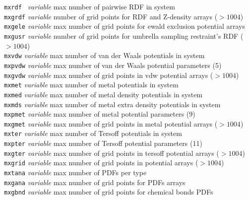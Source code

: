 \begin{tabbing}
\> {\tt mxrdf }      \> {\em variable}       \> max number of pairwise RDF in system \\
\> {\tt mxgrdf}      \> {\em variable}       \> number of grid points for RDF and Z-density arrays ($> 1004$)\\
\> {\tt mxgele}      \> {\em variable}       \> max number of grid points for ewald exclusion potential arrays \\
\> {\tt mxgusr}      \> {\em variable}       \> number of grid points for umbrella sampling restraint's RDF ($> 1004$)\\
\> {\tt mxvdw}       \> {\em variable}       \> max number of van der Waals potentials in system \\
\> {\tt mxpvdw}      \> {\em variable}       \> max number of van der Waals potential parameters (5) \\
\> {\tt mxgvdw}      \> {\em variable}       \> max number of grid points in vdw potential arrays ($> 1004$) \\
\> {\tt mxmet}       \> {\em variable}       \> max number of metal potentials in system \\
\> {\tt mxmed}       \> {\em variable}       \> max number of metal density potentials in system \\
\> {\tt mxmds}       \> {\em variable}       \> max number of metal extra density potentials in system \\
\> {\tt mxpmet}      \> {\em variable}       \> max number of metal potential parameters (9) \\
\> {\tt mxgmet}      \> {\em variable}       \> max number of grid points in metal potential arrays ($> 1004$)\\
\> {\tt mxter}       \> {\em variable}       \> max number of Tersoff potentials in system \\
\> {\tt mxpter}      \> {\em variable}       \> max number of Tersoff potential parameters (11) \\
\> {\tt mxgter}      \> {\em variable}       \> max number of grid points in tersoff potential arrays ($> 1004$)\\
\> {\tt mxgrid}      \> {\em variable}       \> max number of grid points in potential arrays ($> 1004$)\\
\> {\tt mxtana}      \> {\em variable}       \> max number of PDFs per type \\
\> {\tt mxgana}      \> {\em variable}       \> max number of grid points for PDFs arrays \\
\> {\tt mxgbnd}      \> {\em variable}       \> max number of grid points for chemical bonds PDFs \\

\end{tabbing}
